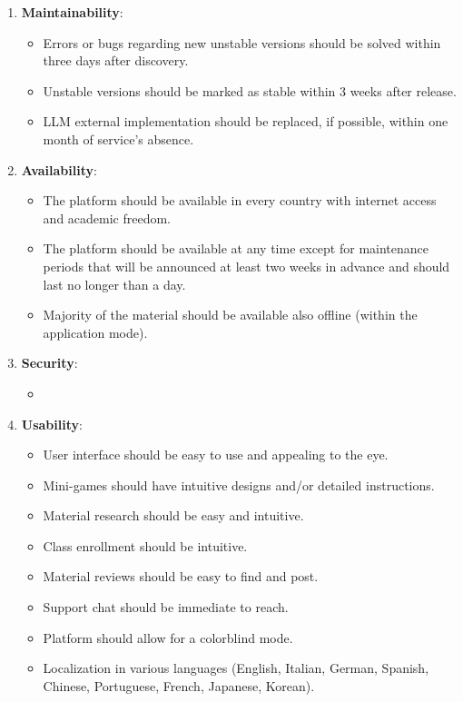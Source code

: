 \begin{enumerate}
	\item \textbf{Maintainability}: 
	\begin{itemize}
		\item Errors or bugs regarding new unstable versions should be solved within three days after discovery.
		\item Unstable versions should be marked as stable within 3 weeks after release.
		\item LLM external implementation should be replaced, if possible, within one month of service's absence.
	\end{itemize}
	
	\item \textbf{Availability}: 
	\begin{itemize}
		\item The platform should be available in every country with internet access and academic freedom.
		\item The platform should be available at any time except for maintenance periods that will be announced at least two weeks in advance and should last no longer than a day.
		\item Majority of the material should be available also offline (within the application mode).
	\end{itemize}
	
	\item \textbf{Security}: 
	\begin{itemize}
		\item
	\end{itemize}
	
	\item \textbf{Usability}: 
	\begin{itemize}
		\item User interface should be easy to use and appealing to the eye.
		\item Mini-games should have intuitive designs and/or detailed instructions.
		\item Material research should be easy and intuitive.
		\item Class enrollment should be intuitive.
		\item Material reviews should be easy to find and post.
		\item Support chat should be immediate to reach.
		\item Platform should allow for a colorblind mode.			
		\item Localization in various languages (English, Italian, German, Spanish, Chinese, Portuguese, French, Japanese, Korean).
	\end{itemize}
\end{enumerate}

